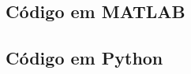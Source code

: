 \documentclass[10pt,a4paper]{article}
\begin{document}
    \newpage
    \subsection{Código em MATLAB}
    
    
    \newpage
    \subsection{Código em Python}
    
    
\end{document}
